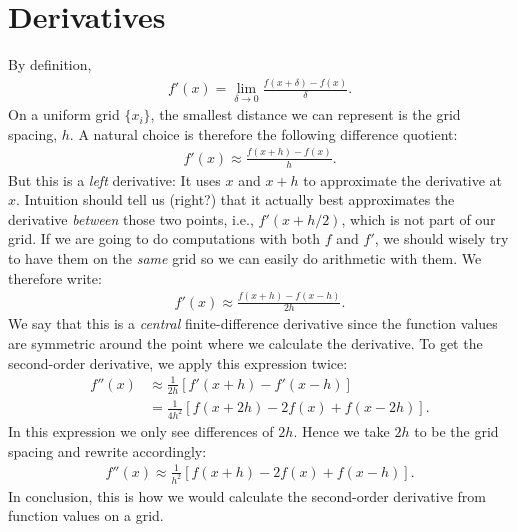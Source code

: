 \documentclass{article}
\begin{document}
\section{Derivatives}
By definition,
\begin{align}
  f'(x) = \lim_{\delta\rightarrow 0} \frac{f(x + \delta) - f(x)}{\delta}.
\end{align}
On a uniform grid $\{x_i\}$, the smallest distance we can represent is the grid
spacing, $h$.
A natural choice is therefore the following difference quotient:
\begin{align}
  f'(x) \approx \frac{f(x + h) - f(x)}{h}.
\end{align}
But this is a \emph{left} derivative: It uses $x$ and $x + h$ to
approximate the derivative at $x$.  Intuition should tell us (right?) that
it actually best approximates the derivative \emph{between} those two points,
i.e., $f'(x + h/2)$, which is not part of our grid.
If we are going to do computations with both $f$ and $f'$, we should wisely
try to have them on the \emph{same} grid so we can easily do
arithmetic with them.
We therefore write:
\begin{align}
  f'(x) \approx \frac{f(x + h) - f(x - h)}{2h}.
\end{align}
We say that this is a \emph{central} finite-difference
derivative since the function values are symmetric around the point where we
calculate the derivative.
To get the second-order derivative, we apply this expression twice:
\begin{align}
  f''(x) &\approx \frac{1}{2h} \left[f'(x + h) - f'(x - h) \right] \nonumber\\
  &= \frac{1}{4h^2} \left[
  f(x + 2 h) - 2 f(x) + f(x - 2 h)
  \right].
\end{align}
In this expression we only see differences of $2h$.   Hence we take $2h$ to
be the grid spacing and rewrite accordingly:
\begin{align}
  f''(x) \approx \frac{1}{h^2}\left[f(x + h) - 2 f(x) + f(x - h)\right].
\end{align}
In conclusion, this is how we would calculate the second-order
derivative from function values on a grid.
\end{document}
